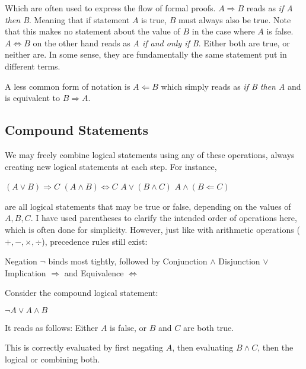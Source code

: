 Which are often used to express the flow of formal proofs.
\(A \Rightarrow B\) reads as \emph{if A then B}. Meaning that if statement \(A\)
is true, \(B\) must always also be true. Note that this makes no statement
about the value of \(B\) in the case where \(A\) is false.
\(A \Leftrightarrow B\) on the other hand reads as \emph{A if and only if B}.
Either both are true, or neither are. In some sense, they are fundamentally the
same statement put in different terms.

A less common form of notation is \(A \Leftarrow B\) which simply reads as
\emph{if B then A} and is equivalent to \(B \Rightarrow A\).

\subsection{Compound Statements}
We may freely combine logical statements using any of these operations, always
creating new logical statements at each step. For instance,
\begin{example}
  \((A \lor B) \Rightarrow C\)
  \hfill
  \((A \land B) \Leftrightarrow C\)
  \hfill
  \(A \lor (B \land C)\)
  \hfill
  \(A \land (B \Leftarrow C)\)
\end{example}

are all logical statements that may be true or false, depending on the values of
\(A, B, C\).
I have used parentheses to clarify the intended order of operations here, which
is often done for simplicity. However, just like with arithmetic operations
(\(+, -, \times, \div\)), precedence rules still exist:
\begin{itemize}
  \ii{} Negation \(\neg\) binds most tightly, followed by
  \ii{} Conjunction \(\land\)
  \ii{} Disjunction \(\lor\)
  \ii{} Implication \(\Rightarrow\) and
  \ii{} Equivalence \(\Leftrightarrow\)
\end{itemize}

\begin{example}
  Consider the compound logical statement:\\
  \begin{center}
    \(\neg A \lor A \land B\)
  \end{center}
  It reads as follows: Either \(A\) is false, or \(B\) and \(C\) are both true.

  This is correctly evaluated by first negating \(A\), then evaluating
  \(B \land C\), then the logical or combining both.
\end{example}
